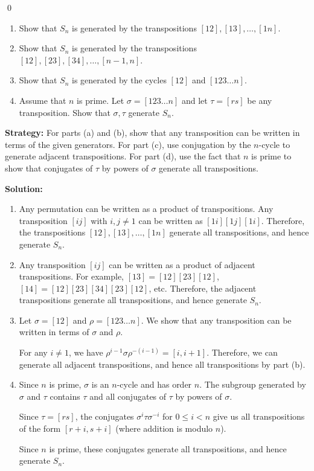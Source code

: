\qed
\begin{problembox}
\begin{enumerate}[label=(\alph*)]
\item Show that $S_n$ is generated by the transpositions $[12], [13], \ldots, [1n]$.
\item Show that $S_n$ is generated by the transpositions $[12], [23], [34], \ldots, [n - 1, n]$.
\item Show that $S_n$ is generated by the cycles $[12]$ and $[123 \ldots n]$.
\item Assume that $n$ is prime. Let $\sigma = [123 \ldots n]$ and let $\tau = [rs]$ be any transposition. Show that $\sigma, \tau$ generate $S_n$.
\end{enumerate}
\end{problembox}

\noindent\textbf{Strategy:} For parts (a) and (b), show that any transposition can be written in terms of the given generators. For part (c), use conjugation by the $n$-cycle to generate adjacent transpositions. For part (d), use the fact that $n$ is prime to show that conjugates of $\tau$ by powers of $\sigma$ generate all transpositions.

\noindent\textbf{Solution:}
\begin{enumerate}[label=(\alph*)]
\item Any permutation can be written as a product of transpositions. Any transposition $[ij]$ with $i, j \neq 1$ can be written as $[1i][1j][1i]$. Therefore, the transpositions $[12], [13], \ldots, [1n]$ generate all transpositions, and hence generate $S_n$.

\item Any transposition $[ij]$ can be written as a product of adjacent transpositions. For example, $[13] = [12][23][12]$, $[14] = [12][23][34][23][12]$, etc. Therefore, the adjacent transpositions generate all transpositions, and hence generate $S_n$.

\item Let $\sigma = [12]$ and $\rho = [123 \ldots n]$. We show that any transposition can be written in terms of $\sigma$ and $\rho$.

For any $i \neq 1$, we have $\rho^{i-1}\sigma\rho^{-(i-1)} = [i, i+1]$. Therefore, we can generate all adjacent transpositions, and hence all transpositions by part (b).

\item Since $n$ is prime, $\sigma$ is an $n$-cycle and has order $n$. The subgroup generated by $\sigma$ and $\tau$ contains $\tau$ and all conjugates of $\tau$ by powers of $\sigma$.

Since $\tau = [rs]$, the conjugates $\sigma^i\tau\sigma^{-i}$ for $0 \leq i < n$ give us all transpositions of the form $[r+i, s+i]$ (where addition is modulo $n$).

Since $n$ is prime, these conjugates generate all transpositions, and hence generate $S_n$.
\end{enumerate}


